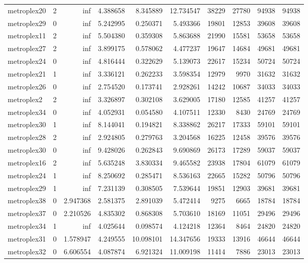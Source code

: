 \begin{longtable}{|l|r|r|r|r|r|r|r|r|r|}
metroplex20 & 2 & inf & 4.388658 & 8.345889 & 12.734547 & 38229 & 27780 & 94938 & 94938 \\
metroplex29 & 0 & inf & 5.242995 & 0.250371 & 5.493366 & 19801 & 12853 & 39608 & 39608 \\
metroplex11 & 2 & inf & 5.504380 & 0.359308 & 5.863688 & 21990 & 15581 & 53658 & 53658 \\
metroplex27 & 2 & inf & 3.899175 & 0.578062 & 4.477237 & 19647 & 14684 & 49681 & 49681 \\
metroplex24 & 0 & inf & 4.816444 & 0.322629 & 5.139073 & 22617 & 15234 & 50724 & 50724 \\
metroplex21 & 1 & inf & 3.336121 & 0.262233 & 3.598354 & 12979 & 9970 & 31632 & 31632 \\
metroplex26 & 0 & inf & 2.754520 & 0.173741 & 2.928261 & 14242 & 10687 & 34033 & 34033 \\
metroplex2 & 2 & inf & 3.326897 & 0.302108 & 3.629005 & 17180 & 12585 & 41257 & 41257 \\
metroplex34 & 0 & inf & 4.052931 & 0.054580 & 4.107511 & 12330 & 8430 & 24769 & 24769 \\
metroplex30 & 1 & inf & 8.144041 & 0.194821 & 8.338862 & 26217 & 17333 & 59101 & 59101 \\
metroplex28 & 2 & inf & 2.924805 & 0.279763 & 3.204568 & 16225 & 12458 & 39576 & 39576 \\
metroplex30 & 0 & inf & 9.428026 & 0.262843 & 9.690869 & 26173 & 17289 & 59037 & 59037 \\
metroplex16 & 2 & inf & 5.635248 & 3.830334 & 9.465582 & 23938 & 17804 & 61079 & 61079 \\
metroplex24 & 1 & inf & 8.250692 & 0.285471 & 8.536163 & 22665 & 15282 & 50796 & 50796 \\
metroplex29 & 1 & inf & 7.231139 & 0.308505 & 7.539644 & 19851 & 12903 & 39681 & 39681 \\
metroplex38 & 0 & 2.947368 & 2.581375 & 2.891039 & 5.472414 & 9275 & 6665 & 18784 & 18784 \\
metroplex37 & 0 & 2.210526 & 4.835302 & 0.868308 & 5.703610 & 18169 & 11051 & 29496 & 29496 \\
metroplex34 & 1 & inf & 4.025644 & 0.098574 & 4.124218 & 12364 & 8464 & 24820 & 24820 \\
metroplex31 & 0 & 1.578947 & 4.249555 & 10.098101 & 14.347656 & 19333 & 13916 & 46644 & 46644 \\
metroplex32 & 0 & 6.606554 & 4.087874 & 6.921324 & 11.009198 & 11414 & 7886 & 23013 & 23013 \\

\end{longtable}
